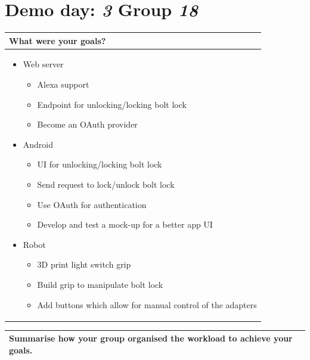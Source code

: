 \documentclass[a4paper]{article}
\newcommand{\colWidth}{141mm}
\begin{document}
 
\section*{Demo day: \textit{3} Group \textit{18}}


\begin{center}
\begin{tabular}{|p{\colWidth}|}
	\hline
	\cellcolor{blue!25}\large
	\textbf{What were your goals?}
	\\ \hline
	
	\begin{itemize}
		\item Web server 
		\begin{itemize}
			\item Alexa support
			\item Endpoint for unlocking/locking bolt lock
			\item Become an OAuth provider
		\end{itemize}
		\item Android
		\begin{itemize}
			\item UI for unlocking/locking bolt lock
			\item Send request to lock/unlock bolt lock
			\item Use OAuth for authentication
			\item Develop and test a mock-up for a better app UI
		\end{itemize}
		\item Robot
		\begin{itemize}
			\item 3D print light switch grip
			\item Build grip to manipulate bolt lock
			\item Add buttons which allow for manual control of the adapters
		\end{itemize}
	\end{itemize}
	\\ \hline
\end{tabular}
\vskip 5mm


\begin{tabular}{|p{\colWidth}|}
	\hline
	\cellcolor{blue!25}\large
	\textbf{Summarise how your group organised the workload to achieve your goals.}
	\\ \hline
	

\end{tabular}
\end{center}
\end{document}
